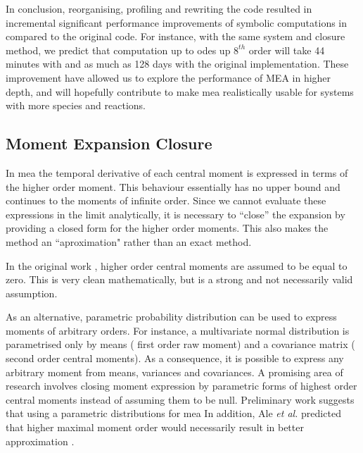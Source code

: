 In conclusion, reorganising, profiling and rewriting the code resulted in incremental significant performance improvements of symbolic computations in \means{} compared to the original \mat{} code.
For instance, with the same \pft{} system and closure method, 
we predict that computation up to \gls{ode}s up $8^{th}$ order will take 44 minutes with \means{} and as much as 128 days with the original implementation.
These improvement have allowed us to explore the performance of MEA in higher depth, and will hopefully contribute to make \gls{mea} realistically usable for systems with more species and reactions.

\subsection{Moment Expansion Closure}

In \gls{mea} the temporal derivative of each central moment is expressed in terms of the higher order moment. 
This behaviour essentially has no upper bound and continues to the moments of infinite order. 
Since we cannot evaluate these expressions in the limit analytically, it is necessary to ``close'' the expansion by providing a closed form for the higher order moments. This also makes the method an ``aproximation" rather than an exact method.

In the original work \cite{ale_general_2013}, higher order central moments are assumed to be equal to zero. This is very clean mathematically, but is a strong and not necessarily valid assumption. 

As an alternative, parametric probability distribution can be used to express moments of arbitrary orders. 
For instance, a multivariate normal distribution is parametrised only by means (\ie{} first order raw moment)
and a covariance matrix (\ie{} second order central moments). 
As a consequence, it is possible to express any arbitrary moment from means, variances and covariances. 
A promising area of research involves closing moment expression by parametric forms of highest order central moments instead
of assuming them to be null.
Preliminary work  suggests that using a parametric distributions for \gls{mea} 
In addition, Ale \emph{et al.} predicted that higher maximal moment order would necessarily result in better approximation \cite{ale_general_2013}.

